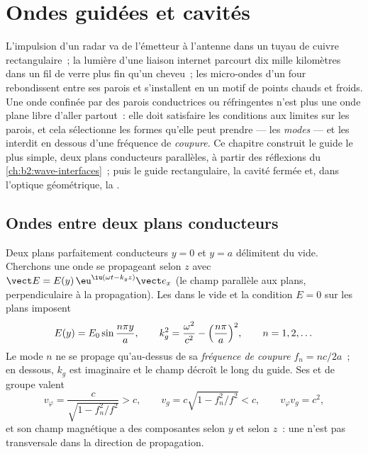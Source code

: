 \chapter{Ondes guidées et cavités}\label{ch:b2:guided-waves}

L'impulsion d'un radar va de l'émetteur à l'antenne dans un tuyau de
cuivre rectangulaire~; la lumière d'une liaison internet parcourt dix
mille kilomètres dans un fil de verre plus fin qu'un cheveu~; les
micro-ondes d'un four rebondissent entre ses parois et s'installent en un
motif de points chauds et froids. Une onde confinée par des parois conductrices ou
réfringentes n'est plus une onde plane libre d'aller partout~: elle
doit satisfaire les conditions aux limites sur les parois, et cela sélectionne
les formes qu'elle peut prendre --- les \emph{modes} --- et les interdit en dessous d'une
fréquence de \emph{coupure}. Ce chapitre construit le guide le plus simple, deux
plans conducteurs parallèles, à partir des réflexions du
\cref{ch:b2:wave-interfaces}~; puis le guide rectangulaire, la
cavité fermée et, dans l'optique géométrique, la .

\section{Ondes entre deux plans conducteurs}

\begin{proposition}\label{prop:b2:guided-waves:plates}
Deux plans parfaitement conducteurs $y = 0$ et $y = a$ délimitent du vide.
Cherchons une onde se propageant selon $z$ avec $\vect E = E(y)\,\eu^{\iu(\omega t - k_gz)}
\vect e_x$ (le champ parallèle aux plans, perpendiculaire à la
propagation). Les  dans le vide et la condition $E = 0$
sur les plans imposent
\[
E(y) = E_0\sin\frac{n\pi y}a , \qquad
k_g^2 = \frac{\omega^2}{c^2} - \Bigl(\frac{n\pi}a\Bigr)^2 , \qquad n = 1, 2, \dots
\]
Le mode $n$ ne se propage qu'au-dessus de sa \emph{fréquence de coupure} $f_n = nc/2a$~;
en dessous, $k_g$ est imaginaire et le champ décroît le long du guide. Ses
 et de groupe valent
\[
v_\varphi = \frac c{\sqrt{1 - f_n^2/f^2}} > c , \qquad
v_g = c\sqrt{1 - f_n^2/f^2} < c , \qquad v_\varphi v_g = c^2 ,
\]
et son champ magnétique a des composantes selon $y$ et selon $z$~: une
 n'est pas transversale dans la direction de propagation.
\end{proposition}


